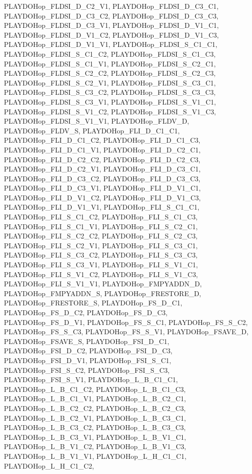 PLAYDOHop\_\-FLDSI\_\-D\_\-C2\_\-V1, PLAYDOHop\_\-FLDSI\_\-D\_\-C3\_\-C1, PLAYDOHop\_\-FLDSI\_\-D\_\-C3\_\-C2, PLAYDOHop\_\-FLDSI\_\-D\_\-C3\_\-C3, PLAYDOHop\_\-FLDSI\_\-D\_\-C3\_\-V1, PLAYDOHop\_\-FLDSI\_\-D\_\-V1\_\-C1, PLAYDOHop\_\-FLDSI\_\-D\_\-V1\_\-C2, PLAYDOHop\_\-FLDSI\_\-D\_\-V1\_\-C3, PLAYDOHop\_\-FLDSI\_\-D\_\-V1\_\-V1, PLAYDOHop\_\-FLDSI\_\-S\_\-C1\_\-C1, PLAYDOHop\_\-FLDSI\_\-S\_\-C1\_\-C2, PLAYDOHop\_\-FLDSI\_\-S\_\-C1\_\-C3, PLAYDOHop\_\-FLDSI\_\-S\_\-C1\_\-V1, PLAYDOHop\_\-FLDSI\_\-S\_\-C2\_\-C1, PLAYDOHop\_\-FLDSI\_\-S\_\-C2\_\-C2, PLAYDOHop\_\-FLDSI\_\-S\_\-C2\_\-C3, PLAYDOHop\_\-FLDSI\_\-S\_\-C2\_\-V1, PLAYDOHop\_\-FLDSI\_\-S\_\-C3\_\-C1, PLAYDOHop\_\-FLDSI\_\-S\_\-C3\_\-C2, PLAYDOHop\_\-FLDSI\_\-S\_\-C3\_\-C3, PLAYDOHop\_\-FLDSI\_\-S\_\-C3\_\-V1, PLAYDOHop\_\-FLDSI\_\-S\_\-V1\_\-C1, PLAYDOHop\_\-FLDSI\_\-S\_\-V1\_\-C2, PLAYDOHop\_\-FLDSI\_\-S\_\-V1\_\-C3, PLAYDOHop\_\-FLDSI\_\-S\_\-V1\_\-V1, PLAYDOHop\_\-FLDV\_\-D, PLAYDOHop\_\-FLDV\_\-S, PLAYDOHop\_\-FLI\_\-D\_\-C1\_\-C1, PLAYDOHop\_\-FLI\_\-D\_\-C1\_\-C2, PLAYDOHop\_\-FLI\_\-D\_\-C1\_\-C3, PLAYDOHop\_\-FLI\_\-D\_\-C1\_\-V1, PLAYDOHop\_\-FLI\_\-D\_\-C2\_\-C1, PLAYDOHop\_\-FLI\_\-D\_\-C2\_\-C2, PLAYDOHop\_\-FLI\_\-D\_\-C2\_\-C3, PLAYDOHop\_\-FLI\_\-D\_\-C2\_\-V1, PLAYDOHop\_\-FLI\_\-D\_\-C3\_\-C1, PLAYDOHop\_\-FLI\_\-D\_\-C3\_\-C2, PLAYDOHop\_\-FLI\_\-D\_\-C3\_\-C3, PLAYDOHop\_\-FLI\_\-D\_\-C3\_\-V1, PLAYDOHop\_\-FLI\_\-D\_\-V1\_\-C1, PLAYDOHop\_\-FLI\_\-D\_\-V1\_\-C2, PLAYDOHop\_\-FLI\_\-D\_\-V1\_\-C3, PLAYDOHop\_\-FLI\_\-D\_\-V1\_\-V1, PLAYDOHop\_\-FLI\_\-S\_\-C1\_\-C1, PLAYDOHop\_\-FLI\_\-S\_\-C1\_\-C2, PLAYDOHop\_\-FLI\_\-S\_\-C1\_\-C3, PLAYDOHop\_\-FLI\_\-S\_\-C1\_\-V1, PLAYDOHop\_\-FLI\_\-S\_\-C2\_\-C1, PLAYDOHop\_\-FLI\_\-S\_\-C2\_\-C2, PLAYDOHop\_\-FLI\_\-S\_\-C2\_\-C3, PLAYDOHop\_\-FLI\_\-S\_\-C2\_\-V1, PLAYDOHop\_\-FLI\_\-S\_\-C3\_\-C1, PLAYDOHop\_\-FLI\_\-S\_\-C3\_\-C2, PLAYDOHop\_\-FLI\_\-S\_\-C3\_\-C3, PLAYDOHop\_\-FLI\_\-S\_\-C3\_\-V1, PLAYDOHop\_\-FLI\_\-S\_\-V1\_\-C1, PLAYDOHop\_\-FLI\_\-S\_\-V1\_\-C2, PLAYDOHop\_\-FLI\_\-S\_\-V1\_\-C3, PLAYDOHop\_\-FLI\_\-S\_\-V1\_\-V1, PLAYDOHop\_\-FMPYADDN\_\-D, PLAYDOHop\_\-FMPYADDN\_\-S, PLAYDOHop\_\-FRESTORE\_\-D, PLAYDOHop\_\-FRESTORE\_\-S, PLAYDOHop\_\-FS\_\-D\_\-C1, PLAYDOHop\_\-FS\_\-D\_\-C2, PLAYDOHop\_\-FS\_\-D\_\-C3, PLAYDOHop\_\-FS\_\-D\_\-V1, PLAYDOHop\_\-FS\_\-S\_\-C1, PLAYDOHop\_\-FS\_\-S\_\-C2, PLAYDOHop\_\-FS\_\-S\_\-C3, PLAYDOHop\_\-FS\_\-S\_\-V1, PLAYDOHop\_\-FSAVE\_\-D, PLAYDOHop\_\-FSAVE\_\-S, PLAYDOHop\_\-FSI\_\-D\_\-C1, PLAYDOHop\_\-FSI\_\-D\_\-C2, PLAYDOHop\_\-FSI\_\-D\_\-C3, PLAYDOHop\_\-FSI\_\-D\_\-V1, PLAYDOHop\_\-FSI\_\-S\_\-C1, PLAYDOHop\_\-FSI\_\-S\_\-C2, PLAYDOHop\_\-FSI\_\-S\_\-C3, PLAYDOHop\_\-FSI\_\-S\_\-V1, PLAYDOHop\_\-L\_\-B\_\-C1\_\-C1, PLAYDOHop\_\-L\_\-B\_\-C1\_\-C2, PLAYDOHop\_\-L\_\-B\_\-C1\_\-C3, PLAYDOHop\_\-L\_\-B\_\-C1\_\-V1, PLAYDOHop\_\-L\_\-B\_\-C2\_\-C1, PLAYDOHop\_\-L\_\-B\_\-C2\_\-C2, PLAYDOHop\_\-L\_\-B\_\-C2\_\-C3, PLAYDOHop\_\-L\_\-B\_\-C2\_\-V1, PLAYDOHop\_\-L\_\-B\_\-C3\_\-C1, PLAYDOHop\_\-L\_\-B\_\-C3\_\-C2, PLAYDOHop\_\-L\_\-B\_\-C3\_\-C3, PLAYDOHop\_\-L\_\-B\_\-C3\_\-V1, PLAYDOHop\_\-L\_\-B\_\-V1\_\-C1, PLAYDOHop\_\-L\_\-B\_\-V1\_\-C2, PLAYDOHop\_\-L\_\-B\_\-V1\_\-C3, PLAYDOHop\_\-L\_\-B\_\-V1\_\-V1, PLAYDOHop\_\-L\_\-H\_\-C1\_\-C1, PLAYDOHop\_\-L\_\-H\_\-C1\_\-C2, 